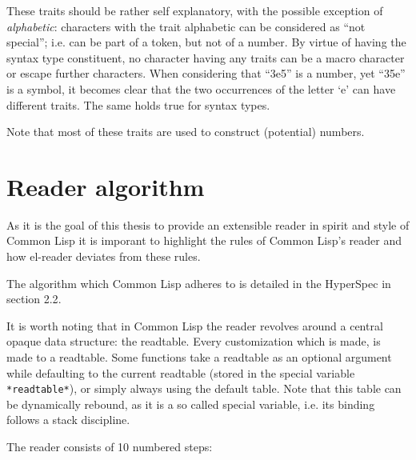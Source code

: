 \documentclass[a4paper,10pt,twoside]{report}
\newcommand{\cl}{Common Lisp}
\newcommand{\elr}{el-reader}
\newcommand{\sym}[1]{\texttt{#1}}
\begin{document}
These traits should be rather self explanatory, with the possible exception of
\emph{alphabetic}: characters with the trait alphabetic can be considered as
``not special''; i.e. can be part of a token, but not of a number.  By virtue of
having the syntax type constituent, no character having any traits can be a
macro character or escape further characters.  When considering that ``3e5'' is
a number, yet ``35e'' is a symbol, it becomes clear that the two occurrences of
the letter `e' can have different traits.  The same holds true for syntax types.

Note that most of these traits are used to construct (potential) numbers.



\section{Reader algorithm}
\label{sec:read-algo}

As it is the goal of this thesis to provide an extensible reader in spirit and
style of \cl{} it is imporant to highlight the rules of \cl{}’s reader and how
\elr{} deviates from these rules.

The algorithm which \cl{} adheres to is detailed in the HyperSpec in section
2.2\cite{hyperspec}.

It is worth noting that in \cl{} the reader revolves around a central opaque
data structure: the readtable.  Every customization which is made, is made to a
readtable.  Some functions take a readtable as an optional argument while
defaulting to the current readtable (stored in the special variable
\sym{*readtable*}), or simply always using the default table.  Note that this
table can be dynamically rebound, as it is a so called special variable,
i.e. its binding follows a stack discipline.

The reader consists of 10 numbered steps:
\end{document}
